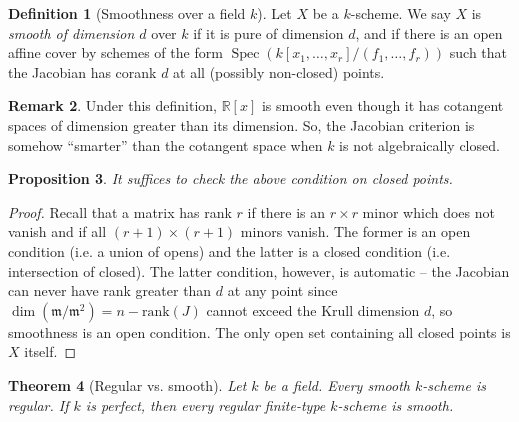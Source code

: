 \documentclass[10pt]{article}
\newtheorem{thm}{Theorem}[section]
\newtheorem{prop}[thm]{Proposition}
\theoremstyle{definition}
\newtheorem{defn}[thm]{Definition}
\newtheorem{rmk}[thm]{Remark}
\DeclareMathOperator{\Spec}{Spec}
\newcommand{\mf}{\mathfrak}
\newcommand{\R}{\mathbb{R}}
\newcommand{\todo}[1]{\textbf{\textcolor{red}{TODO #1}}}
\begin{document}



\begin{defn}[Smoothness over a field $k$]
Let $X$ be a $k$-scheme.  We say $X$ is \emph{smooth of dimension $d$} over $k$  if it is pure of dimension $d$, and if there is an open affine cover by schemes of the form $\Spec(k[x_1, \ldots, x_r]/(f_1, \ldots, f_r))$ such that the Jacobian has corank $d$ at all (possibly non-closed) points.
\end{defn}

\begin{rmk}
Under this definition, $\R[x]$ is smooth even though it has cotangent spaces of dimension greater than its dimension.  So, the Jacobian criterion is somehow ``smarter'' than the cotangent space when $k$ is not algebraically closed.
\end{rmk}

\begin{prop}
It suffices to check the above condition on closed points.
\end{prop}
\begin{proof}
Recall that a matrix has rank $r$ if there is an $r \times r$ minor which does not vanish and if all $(r+1) \times (r+1)$ minors vanish.  The former is an open condition (i.e. a union of opens) and the latter is a closed condition (i.e. intersection of closed).  The latter condition, however, is automatic -- the Jacobian can never have rank greater than $d$ at any point since $\dim(\mf{m}/\mf{m}^2) = n - \text{rank}(J)$ cannot exceed the Krull dimension $d$, so smoothness is an open condition.  The only open set containing all closed points is $X$ itself.
\end{proof}


\begin{thm}[Regular vs. smooth]
Let $k$ be a field.  Every smooth $k$-scheme is regular.  If $k$ is perfect, then every regular finite-type $k$-scheme is smooth.%
\end{thm}
\end{document}
